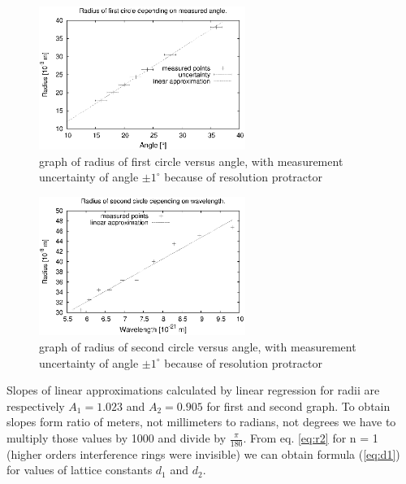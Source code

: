 \documentclass[a4paper,12pt]{article}
\begin{document}
\begin{figure}[H]
    \begin{center}
        \includegraphics[width=0.60\textwidth]{r-ang1}
        \caption{graph of radius of first circle versus angle, with measurement uncertainty of angle $\pm 1^{\circ}$ because of resolution protractor}
        \label{fig:r-ang1}
    \end{center}
\end{figure}

\begin{figure}[H]
    \begin{center}
        \includegraphics[width=0.60\textwidth]{r-ang2}
        \caption{graph of radius of second circle versus angle, with measurement uncertainty of angle $\pm 1^{\circ}$ because of resolution protractor}
        \label{fig:r-ang2}
    \end{center}
\end{figure}

Slopes of linear approximations calculated by linear regression for radii are respectively $A_1 = 1.023$ and $A_2 = 0.905$ for first and second graph. To obtain slopes form ratio of meters, not millimeters to radians, not degrees we have to multiply those values by 1000 and divide by $\frac{\pi}{180}$. From eq. \ref{eq:r2} for n = 1 (higher orders interference rings were invisible) we can obtain formula (\ref{eq:d1}) for values of lattice constants $d_1$ and $d_2$.
\end{document}
